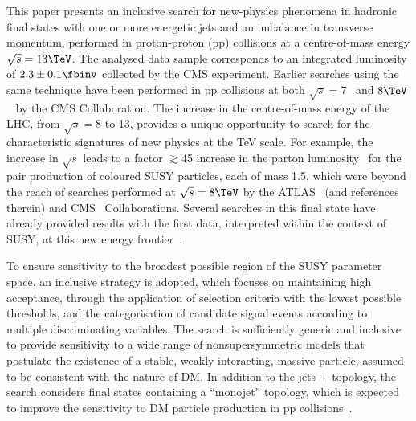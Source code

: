 This paper presents an inclusive search for new-physics phenomena in
hadronic final states with one or more energetic jets and an imbalance
in transverse momentum, performed in proton-proton (pp) collisions at
a centre-of-mass energy $\sqrt{s} = 13\TeV$. The analysed data sample
corresponds to an integrated luminosity of $2.3 \pm 0.1
\fbinv$ %
collected by the CMS experiment. Earlier searches using the same
technique have been performed in pp collisions at both $\sqrt{s} =
7$~\cite{RA1Paper, RA1Paper2011, RA1Paper2011FULL} and
$8\TeV$~\cite{RA1Paper2012, RA1Parked} by the CMS Collaboration.
The increase in the centre-of-mass energy of the LHC, from $\sqrt{s} =
8$ to 13\TeV, provides a unique opportunity to search for the
characteristic signatures of new physics at the TeV scale. For
example, the increase in $\sqrt{s}$ leads to a factor $\gtrsim$45
increase in the parton luminosity~\cite{Martin:2009iq} for the pair
production of coloured SUSY particles, each of mass 1.5\TeV,
which were beyond the reach of searches performed at $\sqrt{s} =
8\TeV$ by the ATLAS~\cite{Aad:2015iea, Aad:2015pfx} (and references
therein) and CMS~\cite{CMS:2014dpa, Khachatryan:2015vra,
  Khachatryan:2016oia, Chatrchyan:2013wxa, Chatrchyan:2014lfa,
  Khachatryan:2015pwa, Khachatryan:2015wza, Khachatryan:2016zcu}
Collaborations. Several searches in this final state have already
provided results with the first data, interpreted within the context
of SUSY, at this new energy frontier~\cite{Aad:2016jxj,
  Aaboud:2016tnv, Aaboud:2016zdn, Aad:2016eki, Aaboud:2016nwl,
  Khachatryan:2016kdk, cms-13}.

To ensure sensitivity to the broadest possible region of the SUSY
parameter space, an inclusive strategy is adopted, which focuses on
maintaining high acceptance, through the application of selection
criteria with the lowest possible thresholds, and the categorisation
of candidate signal events according to multiple discriminating
variables.  The search is sufficiently generic and inclusive to
provide sensitivity to a wide range of nonsupersymmetric models that
postulate the existence of a stable, weakly interacting, massive
particle, assumed to be consistent with the nature of DM. In addition
to the jets + \ptvecmiss topology, the search considers final states
containing a ``monojet'' topology, which is expected to improve the
sensitivity to DM particle production in pp
collisions~\cite{Fox:2012ee, Buchmueller:2015eea}.

